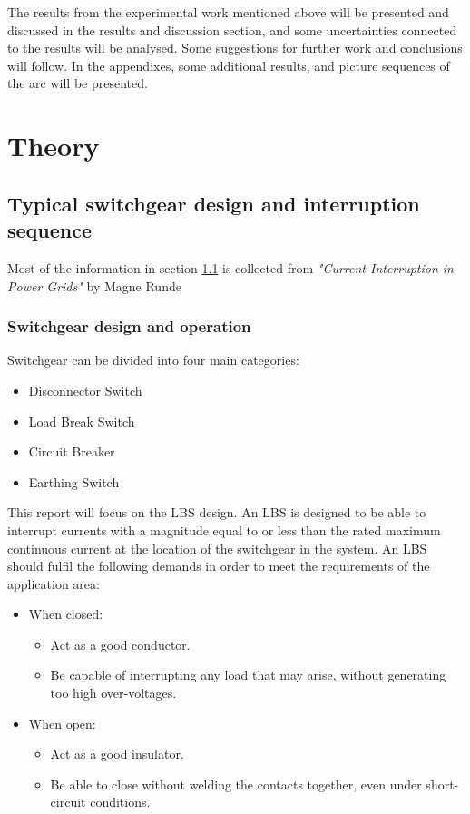\documentclass[10pt,b5paper,twoside]{article}
\begin{document}
The results from the experimental work mentioned above will be presented and discussed in the results and discussion section, and some uncertainties connected to the results will be analysed. Some suggestions for further work and conclusions will follow. In the appendixes, some additional results, and picture sequences of the arc will be presented.

\cleardoublepage

\section{Theory}
\subsection{Typical switchgear design and interruption sequence} \label{sec:genDes}
Most of the information in section \ref{sec:genDes} is collected from \textit{"Current Interruption in Power Grids"} by Magne Runde \cite{bib:HVEbreak} \newline

\subsubsection{Switchgear design and operation} \label{sec:InterruptCurrent}
Switchgear can be divided into four main categories:
\begin{itemize}
\item Disconnector Switch
\item Load Break Switch
\item Circuit Breaker
\item Earthing Switch
\end{itemize}

This report will focus on the LBS design. An LBS is designed to be able to interrupt currents with a magnitude equal to or less than the rated maximum continuous current at the location of the switchgear in the system. An LBS should fulfil the following demands in order to meet the requirements of the application area:

\begin{itemize}
\item When closed:
	\begin{itemize}
		\item Act as a good conductor.
		\item Be capable of interrupting any load that may arise, without generating too high over-voltages. 
	\end{itemize}
\item When open:
	\begin{itemize}
		\item Act as a good insulator.
		\item Be able to close without welding the contacts together, even under short-circuit conditions.
	\end{itemize}
\end{itemize}
\end{document}
